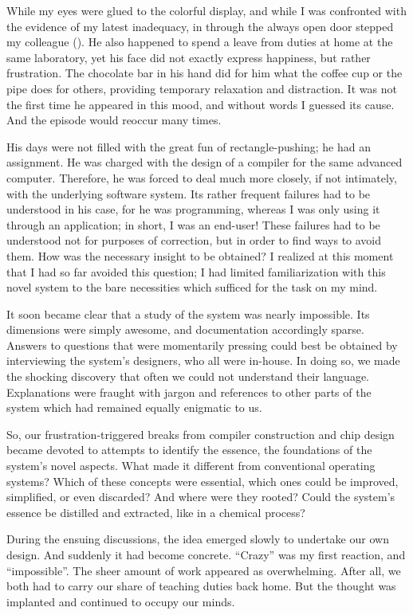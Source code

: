 While my eyes were glued to the colorful display, and while I was
confronted with the evidence of my latest inadequacy, in through the
always open door stepped my colleague (). He also happened to spend
a leave from duties at home at the same laboratory, yet his face did
not exactly express happiness, but rather frustration. The chocolate
bar in his hand did for him what the coffee cup or the pipe does for
others, providing temporary relaxation and distraction. It was not the
first time he appeared in this mood, and without words I guessed its
cause. And the episode would reoccur many times.

His days were not filled with the great fun of rectangle-pushing; he
had an assignment. He was charged with the design of a compiler for
the same advanced computer. Therefore, he was forced to deal much more
closely, if not intimately, with the underlying software system. Its
rather frequent failures had to be understood in his case, for he was
programming, whereas I was only using it through an application; in
short, I was an end-user! These failures had to be understood not for
purposes of correction, but in order to find ways to avoid them. How
was the necessary insight to be obtained? I realized at this moment
that I had so far avoided this question; I had limited familiarization
with this novel system to the bare necessities which sufficed for the
task on my mind.

It soon became clear that a study of the system was nearly
impossible. Its dimensions were simply awesome, and documentation
accordingly sparse. Answers to questions that were momentarily
pressing could best be obtained by interviewing the system's
designers, who all were in-house. In doing so, we made the shocking
discovery that often we could not understand their
language. Explanations were fraught with jargon and references to
other parts of the system which had remained equally enigmatic to us.

So, our frustration-triggered breaks from compiler construction and
chip design became devoted to attempts to identify the essence, the
foundations of the system's novel aspects. What made it different from
conventional operating systems? Which of these concepts were
essential, which ones could be improved, simplified, or even
discarded? And where were they rooted? Could the system's essence be
distilled and extracted, like in a chemical process?

During the ensuing discussions, the idea emerged slowly to undertake
our own design. And suddenly it had become concrete. ``Crazy'' was my
first reaction, and ``impossible''. The sheer amount of work appeared as
overwhelming. After all, we both had to carry our share of teaching
duties back home. But the thought was implanted and continued to
occupy our minds.

